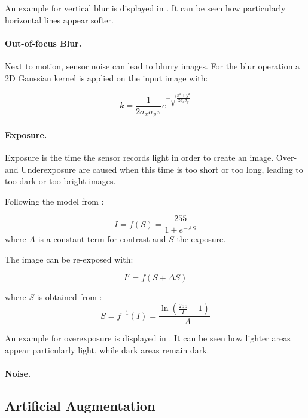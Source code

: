 An example for vertical blur is displayed in . It can be seen how particularly horizontal lines appear softer.

\paragraph{Out-of-focus Blur.}

Next to motion, sensor noise can lead to blurry images. For the blur operation a 2D Gaussian kernel is applied on the input image with:

\begin{equation}
 k = \frac{1}{2\sigma_x\sigma_y\pi}e^{-\sqrt{\frac{x^2 + y^2}{2\sigma_x\sigma_y}}} 
\end{equation}

\paragraph{Exposure.}

Exposure is the time the sensor records light in order to create an image. Over- and Underexposure are caused when this time is too short or too long, leading to too dark or too bright images.

Following the model from \cite{Carlson2018}:
 
\begin{equation}
 I = f(S) = \frac{255}{1 + e^{-A S}}
\end{equation}
where $A$ is a constant term for contrast and $S$ the exposure.

The image can be re-exposed with:

\begin{equation}
	I' = f(S+\Delta S)
\end{equation}

where $S$ is obtained from :
\begin{equation}
S = f^{-1}(I) = \frac{\ln(\frac{255}{I}-1)}{-A}
\end{equation}

An example for overexposure is displayed in . It can be seen how lighter areas appear particularly light, while dark areas remain dark.

\paragraph{Noise.}

\subsection{Artificial Augmentation}

